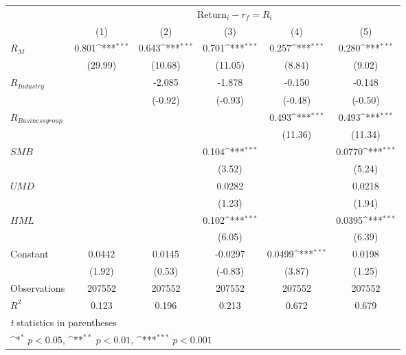 {
\def\sym#1{\ifmmode^{#1}\else\(^{#1}\)\fi}
\begin{tabular}{l*{5}{c}}
\hline\hline
                &\multicolumn{5}{c}{ $ \text{Return}_i - r_f = R_i$ }                                          \\\cmidrule(lr){2-6}
                &\multicolumn{1}{c}{(1)}         &\multicolumn{1}{c}{(2)}         &\multicolumn{1}{c}{(3)}         &\multicolumn{1}{c}{(4)}         &\multicolumn{1}{c}{(5)}         \\
\hline
 $ R_M $        &    0.801\sym{***}&    0.643\sym{***}&    0.701\sym{***}&    0.257\sym{***}&    0.280\sym{***}\\
                &  (29.99)         &  (10.68)         &  (11.05)         &   (8.84)         &   (9.02)         \\
[1em]
 $ R_{Industry} $ &                  &   -2.085         &   -1.878         &   -0.150         &   -0.148         \\
                &                  &  (-0.92)         &  (-0.93)         &  (-0.48)         &  (-0.50)         \\
[1em]
 $ R_{Business group} $ &                  &                  &                  &    0.493\sym{***}&    0.493\sym{***}\\
                &                  &                  &                  &  (11.36)         &  (11.34)         \\
[1em]
 $ SMB $        &                  &                  &    0.104\sym{***}&                  &   0.0770\sym{***}\\
                &                  &                  &   (3.52)         &                  &   (5.24)         \\
[1em]
 $ UMD $        &                  &                  &   0.0282         &                  &   0.0218         \\
                &                  &                  &   (1.23)         &                  &   (1.94)         \\
[1em]
 $ HML $        &                  &                  &    0.102\sym{***}&                  &   0.0395\sym{***}\\
                &                  &                  &   (6.05)         &                  &   (6.39)         \\
[1em]
Constant        &   0.0442         &   0.0145         &  -0.0297         &   0.0499\sym{***}&   0.0198         \\
                &   (1.92)         &   (0.53)         &  (-0.83)         &   (3.87)         &   (1.25)         \\
\hline
Observations    &   207552         &   207552         &   207552         &   207552         &   207552         \\
\(R^{2}\)       &    0.123         &    0.196         &    0.213         &    0.672         &    0.679         \\
\hline\hline
\multicolumn{6}{l}{\footnotesize \textit{t} statistics in parentheses}\\
\multicolumn{6}{l}{\footnotesize \sym{*} \(p<0.05\), \sym{**} \(p<0.01\), \sym{***} \(p<0.001\)}\\
\end{tabular}
}
